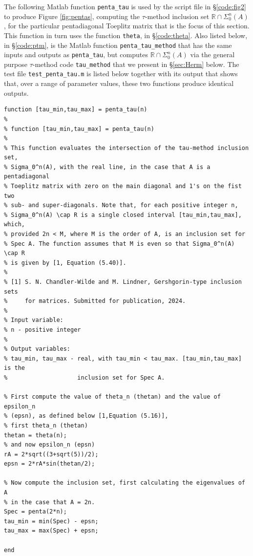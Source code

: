 \documentclass[preprint,1p,11pt]{elsarticle}
\newcommand\R{{\mathbb R}}
\numberwithin{equation}{section}   %
\numberwithin{figure}{section}  %
\begin{document}
The following Matlab function \verb+penta_tau+ is used by the script file in \S\ref{code:fig2} to produce Figure \ref{fig:pentas}, computing the $\tau$-method inclusion set $\R\cap \Sigma_0^n(A)$, for the particular pentadiagonal Toeplitz matrix that is the focus of this section. This function in turn uses the function \verb+theta+, in \S\ref{code:theta}. Also listed below, in \S\ref{code:ptm}, is the Matlab function \verb+penta_tau_method+ that has the same inputs and outputs as \verb+penta_tau+, but computes $\R\cap \Sigma_0^n(A)$ via the general purpose $\tau$-method code \verb+tau_method+ that we present in \S\ref{sec:Herm} below. The test file \verb+test_penta_tau.m+ is listed below together with its output that shows that, over a range of parameter values, these two functions produce identical outputs.

\begin{verbatim}
function [tau_min,tau_max] = penta_tau(n)
%
% function [tau_min,tau_max] = penta_tau(n)
%
% This function evaluates the intersection of the tau-method inclusion set, 
% Sigma_0^n(A), with the real line, in the case that A is a pentadiagonal
% Toeplitz matrix with zero on the main diagonal and 1's on the fist two
% sub- and super-diagonals. Note that, for each positive integer n,
% Sigma_0^n(A) \cap R is a single closed interval [tau_min,tau_max], which,
% provided 2n < M, where M is the order of A, is an inclusion set for 
% Spec A. The function assumes that M is even so that Sigma_0^n(A) \cap R 
% is given by [1, Equation (5.40)].
%
% [1] S. N. Chandler-Wilde and M. Lindner, Gershgorin-type inclusion sets
%     for matrices. Submitted for publication, 2024.
%
% Input variable:
% n - positive integer
%
% Output variables:
% tau_min, tau_max - real, with tau_min < tau_max. [tau_min,tau_max] is the
%                    inclusion set for Spec A.

% First compute the value of theta_n (thetan) and the value of epsilon_n 
% (epsn), as defined below [1,Equation (5.16)],
% first theta_n (thetan)
thetan = theta(n);
% and now epsilon_n (epsn)
rA = 2*sqrt((3+sqrt(5))/2);
epsn = 2*rA*sin(thetan/2);

% Now compute the inclusion set, first calculating the eigenvalues of A
% in the case that A = 2n. 
Spec = penta(2*n);
tau_min = min(Spec) - epsn;
tau_max = max(Spec) + epsn;

end
\end{verbatim}
\end{document}
